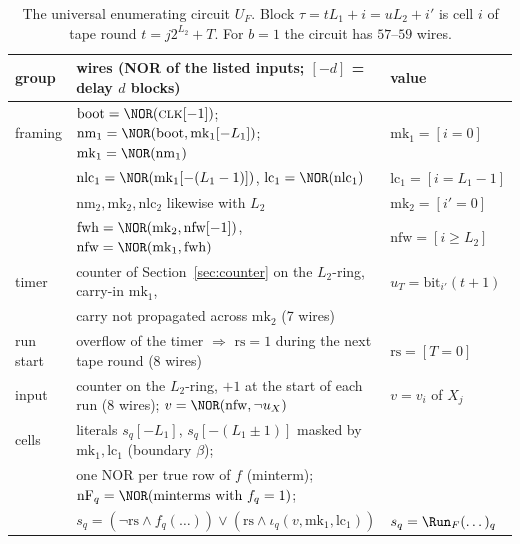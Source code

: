 \begin{table}[t]
\centering\small
\begin{tabular}{lll}
\toprule
group & wires (NOR of the listed inputs; $[-d]$ = delay $d$ blocks) & value\\
\midrule
framing & $\mathrm{boot}=\NOR(\textsc{clk}[-1])$; $\mathrm{nm}_1=\NOR(\mathrm{boot},\mathrm{mk}_1[-L_1])$;
$\mathrm{mk}_1=\NOR(\mathrm{nm}_1)$ & $\mathrm{mk}_1=[i=0]$\\
 & $\mathrm{nlc}_1=\NOR(\mathrm{mk}_1[-(L_1-1)])$, $\mathrm{lc}_1=\NOR(\mathrm{nlc}_1)$ & $\mathrm{lc}_1=[i=L_1-1]$\\
 & $\mathrm{nm}_2,\mathrm{mk}_2,\mathrm{nlc}_2$ likewise with $L_2$ & $\mathrm{mk}_2=[i'=0]$\\
 & $\mathrm{fwh}=\NOR(\mathrm{mk}_2,\mathrm{nfw}[-1])$, $\mathrm{nfw}=\NOR(\mathrm{mk}_1,\mathrm{fwh})$ & $\mathrm{nfw}=[i\ge L_2]$\\
timer & counter of Section~\ref{sec:counter} on the $L_2$-ring, carry-in $\mathrm{mk}_1$, & $u_T=\mathrm{bit}_{i'}(t+1)$\\
 & \quad carry not propagated across $\mathrm{mk}_2$ (7 wires) & \\
run start & overflow of the timer $\Rightarrow$ $\mathrm{rs}=1$ during the next tape round (8 wires) & $\mathrm{rs}=[T=0]$\\
input & counter on the $L_2$-ring, $+1$ at the start of each run (8 wires); $v=\NOR(\mathrm{nfw},\neg u_X)$ & $v=v_i$ of $X_j$\\
cells & literals $s_q[-L_1]$, $s_q[-(L_1\pm1)]$ masked by $\mathrm{mk}_1,\mathrm{lc}_1$ (boundary $\beta$); & \\
 & one NOR per true row of $f$ (minterm); $\mathrm{nF}_q=\NOR(\text{minterms with } f_q=1)$; & \\
 & $s_q=(\neg\mathrm{rs}\wedge f_q(\dots))\vee(\mathrm{rs}\wedge\iota_q(v,\mathrm{mk}_1,\mathrm{lc}_1))$ & $s_q=\Run_F(\dots)_q$\\
\bottomrule
\end{tabular}
\caption{The universal enumerating circuit $U_F$.  Block $\tau=tL_1+i=u L_2+i'$ is cell $i$ of tape
round $t=j2^{L_2}+T$.  For $b=1$ the circuit has $57$--$59$ wires.}
\label{tab:univ}
\end{table}

